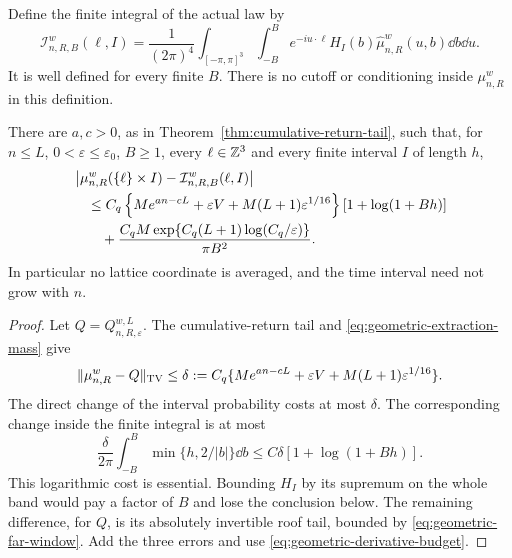 Define the finite integral of the actual law by
\begin{equation}\label{eq:actual-microscopic-finite-integral}
 \mathcal I_{n,R,B}^{w}(\ell,I)
 =\frac1{(2\pi)^4}\int_{[-\pi,\pi]^3}\int_{-B}^{B}
    e^{-iu\cdot\ell}H_I(b)\widehat\mu_{n,R}^w(u,b)\dd b\dd u.
\end{equation}
It is well defined for every finite $B$. There is no cutoff or
conditioning inside $\mu_{n,R}^w$ in this definition.

\begin{theorem}
\label{thm:microscopic-finite-band-reduction}
There are $a,c>0$, as in Theorem~\ref{thm:cumulative-return-tail}, such
that, for $n\le L$, $0<\varepsilon\le\varepsilon_0$, $B\ge1$, every
$\ell\in\mathbb Z^3$ and every finite interval $I$ of length $h$,
\begin{align}
 &\left|\mu_{n,R}^w(\{\ell\}\times I)
                    -\mathcal I_{n,R,B}^{w}(\ell,I)\right|\notag\\
 &\quad\le C_q\left\{M e^{an-cL}+\varepsilon V
                    +M(L+1)\varepsilon^{1/16}\right\}
                         [1+\log(1+Bh)]\notag\\
 &\qquad+\frac{C_qM\exp\{C_q(L+1)\log(C_q/\varepsilon)\}}{\pi B^2}.
                 \label{eq:microscopic-finite-band-error}
\end{align}
In particular no lattice coordinate is averaged, and the time interval
need not grow with $n$.
\end{theorem}
\begin{proof}
Let $Q=Q_{n,R,\varepsilon}^{w,L}$. The cumulative-return tail and
\eqref{eq:geometric-extraction-mass} give
\begin{equation}\label{eq:full-law-geometric-TV}
 \|\mu_{n,R}^w-Q\|_{\TV}
 \le \delta:=C_q\{M e^{an-cL}+\varepsilon V
                         +M(L+1)\varepsilon^{1/16}\}.
\end{equation}
The direct change of the interval probability costs at most $\delta$.
The corresponding change inside the finite integral is at most
\[
 \frac{\delta}{2\pi}\int_{-B}^B\min\{h,2/|b|\}\dd b
       \le C\delta[1+\log(1+Bh)].
\]
This logarithmic cost is essential. Bounding $H_I$ by its supremum on
the whole band would pay a factor of $B$ and lose the conclusion below.
The remaining difference, for $Q$, is its absolutely invertible roof
tail, bounded by \eqref{eq:geometric-far-window}. Add the three errors
and use \eqref{eq:geometric-derivative-budget}.
\end{proof}

